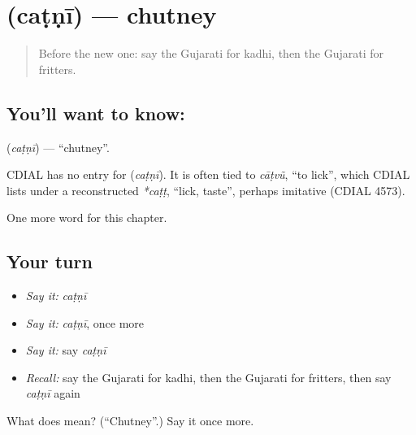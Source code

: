 \section[\texorpdfstring{\gu{ચટણી} (caṭṇī)}{ચટણી (caṭṇī)}]{ (caṭṇī) — chutney}

\label{lesson:GU-C117-catni}



\begin{quote}
Before the new one: say the Gujarati for kadhi, then the Gujarati for fritters.
\end{quote}

\subsection*{You'll want to know: }
\textbf{} (\emph{caṭṇī}) — \textquotedblleft{}chutney\textquotedblright{}.

\begin{cousinweb}
CDIAL has no entry for \textbf{} (\emph{caṭṇī}). It is often tied to \emph{cāṭvũ}, \textquotedblleft{}to lick\textquotedblright{}, which CDIAL lists under a reconstructed \emph{*caṭṭ}, \textquotedblleft{}lick, taste\textquotedblright{}, perhaps imitative (CDIAL 4573).
\end{cousinweb}

\begin{grammarlens}[title={What you've built}]
One more word for this chapter.
\end{grammarlens}

\subsection*{Your turn}
\begin{itemize}
\raggedright
  \item \emph{Say it:} \emph{caṭṇī}
  \item \emph{Say it:} \emph{caṭṇī}, once more
  \item \emph{Say it:} say \emph{caṭṇī}
  \item \emph{Recall:} say the Gujarati for kadhi, then the Gujarati for fritters, then say \emph{caṭṇī} again
\end{itemize}

\begin{tcolorbox}[breakable,colback=teal!4,colframe=teal!35!black,title={Before you move on}]
What does  mean? (\textquotedblleft{}Chutney\textquotedblright{}.) Say it once more.
\end{tcolorbox}
